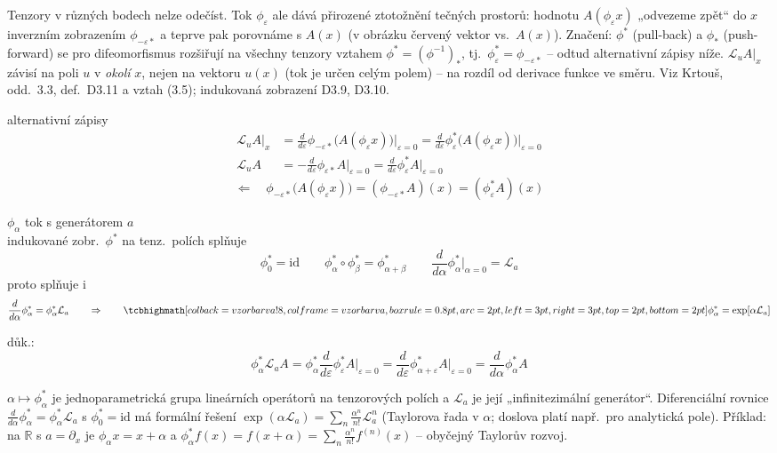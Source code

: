\begin{vysvetleni}
Tenzory v různých bodech nelze odečíst. Tok $\phi_\varepsilon$ ale dává přirozené ztotožnění tečných prostorů: hodnotu $A(\phi_\varepsilon x)$ „odvezeme zpět“ do $x$ inverzním zobrazením $\phi_{-\varepsilon*}$ a teprve pak porovnáme s $A(x)$ (v obrázku červený vektor vs.\ $A(x)$).
Značení: $\phi^*$ (pull-back) a $\phi_*$ (push-forward) se pro difeomorfismus rozšiřují na všechny tenzory vztahem $\phi^*=(\phi^{-1})_*$, tj.\ $\phi_\varepsilon^*=\phi_{-\varepsilon*}$ -- odtud alternativní zápisy níže.
$\mathcal{L}_uA|_x$ závisí na poli $u$ v \emph{okolí} $x$, nejen na vektoru $u(x)$ (tok je určen celým polem) -- na rozdíl od derivace funkce ve směru.
Viz Krtouš, odd.~3.3, def.~D3.11 a vztah (3.5); indukovaná zobrazení D3.9, D3.10.
\end{vysvetleni}

alternativní zápisy
\begin{align*}
  \mathcal{L}_uA\big|_x &= \frac{d}{d\varepsilon}\phi_{-\varepsilon*}\big(A(\phi_\varepsilon x)\big)\Big|_{\varepsilon=0}
    = \frac{d}{d\varepsilon}\phi_\varepsilon^*\big(A(\phi_\varepsilon x)\big)\Big|_{\varepsilon=0} \\
  \mathcal{L}_uA &= -\frac{d}{d\varepsilon}\phi_{\varepsilon*}A\Big|_{\varepsilon=0}
    = \frac{d}{d\varepsilon}\phi_\varepsilon^*A\Big|_{\varepsilon=0}
\end{align*}
\[
  \Leftarrow\quad \phi_{-\varepsilon*}\big(A(\phi_\varepsilon x)\big) = (\phi_{-\varepsilon*}A)(x) = (\phi_\varepsilon^*A)(x)
\]

\begin{veta}[Tvrzení]
$\phi_\alpha$ tok s generátorem $a$ \\
indukované zobr.\ $\phi^*$ na tenz.\ polích splňuje
\[
  \phi_0^* = \mathrm{id} \qquad \phi_\alpha^*\circ\phi_\beta^* = \phi_{\alpha+\beta}^* \qquad
  \frac{d}{d\alpha}\phi_\alpha^*\Big|_{\alpha=0} = \mathcal{L}_a
\]
proto splňuje i
\[
  \frac{d}{d\alpha}\phi_\alpha^* = \phi_\alpha^*\mathcal{L}_a \qquad\Rightarrow\qquad
  \vzorec{\phi_\alpha^* = \exp[\alpha\mathcal{L}_a]}
\]
\end{veta}
důk.:
\[
  \phi_\alpha^*\mathcal{L}_aA = \phi_\alpha^*\frac{d}{d\varepsilon}\phi_\varepsilon^*A\Big|_{\varepsilon=0}
  = \frac{d}{d\varepsilon}\phi_{\alpha+\varepsilon}^*A\Big|_{\varepsilon=0} = \frac{d}{d\alpha}\phi_\alpha^*A
\]

\begin{vysvetleni}[$\phi_\alpha^*=\exp(\alpha\mathcal{L}_a)$]
$\alpha\mapsto\phi_\alpha^*$ je jednoparametrická grupa lineárních operátorů na tenzorových polích a $\mathcal{L}_a$ je její „infinitezimální generátor“. Diferenciální rovnice $\frac{d}{d\alpha}\phi_\alpha^*=\phi_\alpha^*\mathcal{L}_a$ s $\phi_0^*=\mathrm{id}$ má formální řešení $\exp(\alpha\mathcal{L}_a)=\sum_n\frac{\alpha^n}{n!}\mathcal{L}_a^n$ (Taylorova řada v $\alpha$; doslova platí např.\ pro analytická pole).
Příklad: na $\mathbb{R}$ s $a=\partial_x$ je $\phi_\alpha x=x+\alpha$ a $\phi_\alpha^*f(x)=f(x+\alpha)=\sum_n\frac{\alpha^n}{n!}f^{(n)}(x)$ -- obyčejný Taylorův rozvoj.
\end{vysvetleni}

